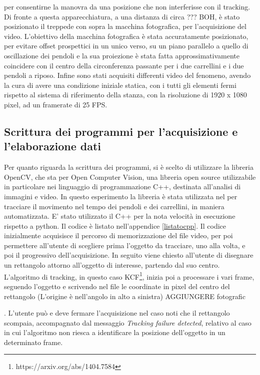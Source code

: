 \documentclass[11pt, a4paper, twoside]{article}
\begin{document}
per consentirne la manovra da una posizione che non interferisse con il tracking.
Di fronte a questa apparecchiatura, a una distanza di circa ??? BOH, è stato 
posizionato il treppede con sopra la macchina fotografica, per l'acquisizione
del video.
L'obiettivo della macchina fotografica è stata accuratamente posizionato, per evitare
offset prospettici in un unico verso, su un piano parallelo a quello di oscillazione dei
pendoli e la sua proiezione è stata fatta approssimativamente coincidere con il
centro della circonferenza passante per i due carrellini e i due pendoli a 
riposo.
Infine sono stati acquisiti differenti video del fenomeno, avendo la cura di avere una condizione
iniziale statica, con i tutti gli elementi fermi rispetto al sistema di riferimento della stanza,
con la risoluzione
di 1920 x 1080 pixel, ad un framerate di 25 FPS.

\subsection{Scrittura dei programmi per l'acquisizione e l'elaborazione dati}

Per quanto riguarda la scrittura dei programmi, si è scelto di utilizzare 
la libreria OpenCV, che sta per Open Computer Vision, una libreria open source 
utilizzabile in particolare nei linguaggio di programmazione C++, 
destinata all'analisi di immagini e video. 
In questo esperimento la libreria è stata utilizzata nel per tracciare il 
movimento nel tempo dei pendoli e dei carrellini, in maniera automatizzata.
E' stato utilizzato il C++ per la nota velocità in esecuzione rispetto a 
python. Il codice è listato nell'appendice \ref{listatocpp}.
Il codice inizialmente acquisisce il percorso di memorizzazione del file video, per poi 
permettere all'utente di scegliere prima l'oggetto da tracciare, uno alla volta,
 e poi 
il progressivo dell'acquisizione.
In seguito viene chiesto all'utente di disegnare un rettangolo attorno
all'oggetto di interesse, partendo dal suo centro.
L'algoritmo di tracking, in questo caso KCF\footnote{https://arxiv.org/abs/1404.7584}, 
inizia poi a processare i vari frame, seguendo l'oggetto e scrivendo nel file
le coordinate in pixel del centro del rettangolo (L'origine è nell'angolo in alto a sinistra)
AGGIUNGERE fotografic

. L'utente può e deve fermare l'acquisizione nel caso noti che il rettangolo
scompaia, accompagnato dal messaggio \textit{Tracking failure detected}, relativo al
caso in cui l'algoritmo non riesca a identificare la posizione dell'oggetto
in un determinato frame.
\end{document}
